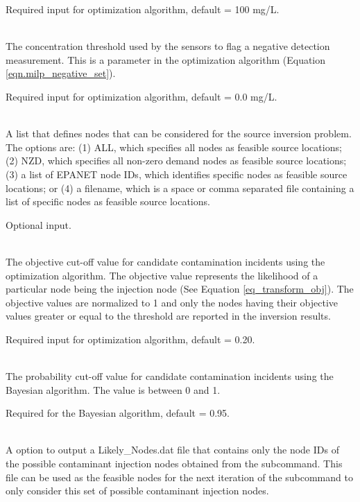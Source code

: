 \begin{description}[topsep=0pt,parsep=0.5em,itemsep=-0.4em]
\begin{description}[topsep=0pt,parsep=0.5em,itemsep=-0.4em]
                Required input for optimization algorithm, default = 100 mg/L. 
    \item[{negative threshold}]\hfill
\\The concentration threshold used by the sensors to flag
                a negative detection measurement. This is a parameter in the
                optimization algorithm (Equation \ref{eqn.milp_negative_set}).
                
                Required input for optimization algorithm, default = 0.0 mg/L.
    \item[{feasible nodes}]\hfill
\\A list that defines nodes that can be considered for the source inversion problem.
                The options are: (1) ALL, which specifies all nodes as feasible source locations;
                (2) NZD, which specifies all non-zero demand nodes as feasible source locations;
                (3) a list of EPANET node IDs, which identifies specific nodes as feasible source locations; or
                (4) a filename, which is a space or comma separated file containing a list of 
                specific nodes as feasible source locations. 

                Optional input.
    \item[{candidate threshold}]\hfill
\\The objective cut-off value for candidate contamination incidents 
                using the optimization algorithm. The objective value represents the
                likelihood of a particular node being the injection node (See Equation \ref{eq_transform_obj}).  
                The objective values are normalized to 1 and only the nodes having 
                their objective values greater or equal to the threshold are reported
                in the inversion results. 
                
                Required input for optimization algorithm, default = 0.20.
    \item[{confidence}]\hfill
\\The probability cut-off value for candidate contamination incidents
                using the Bayesian algorithm. The value is between 0 and 1. 
                
                Required for the Bayesian algorithm, default = 0.95.
    \item[{output impact nodes}]\hfill
\\A option to output a Likely\_Nodes.dat file that contains only
                the node IDs of the possible contaminant injection nodes obtained from the 
                 subcommand. This file can be used as the feasible nodes for the next 
                iteration of the  subcommand to only consider this set of possible contaminant 
                injection nodes.
                

\end{description}
\end{description}
